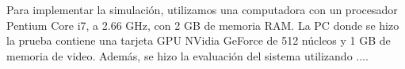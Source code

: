 \documentclass[conference]{IEEEtran}
\begin{document}
Para implementar la simulación, utilizamos una computadora con un procesador Pentium Core i7, a 2.66 GHz, con 2 GB de memoria RAM. La PC donde se hizo la prueba contiene una tarjeta GPU NVidia GeForce de 512 núcleos y 1 GB de memoria de video. Además, se hizo la evaluación del sistema utilizando ....  


%
%
% 
\begin{figure}
\\
\\

\end{figure}
\end{document}
